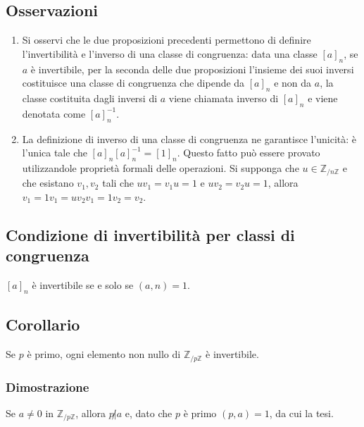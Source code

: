\subsection{Osservazioni}
\begin{enumerate}
\item Si osservi che le due proposizioni precedenti permettono di definire l'invertibilit\`a e l'inverso di una classe di congruenza: data una classe $[a]_n$, se $a$ \`e 
invertibile, per la seconda delle due proposizioni l'insieme dei suoi inversi costituisce una classe di congruenza che dipende da $[a]_n$ e non da $a$, la classe costituita 
dagli inversi di $a$ viene chiamata inverso di $[a]_n$ e viene denotata come $[a]_n^{-1}$. 
\item La definizione di inverso di una classe di congruenza ne garantisce l'unicit\`a: \`e l'unica tale che $[a]_n[a]_n^{-1}=[1]_n$. Questo fatto pu\`o essere provato 
utilizzandole propriet\`a formali delle operazioni. Si supponga che $u\in\mathbb{Z}_{/n\mathbb{Z}}$ e che esistano $v_1,v_2$ tali che $uv_1=v_1u=1$ e $uv_2=v_2u=1$, allora
$v_1=1v_1=uv_2v_1=1v_2=v_2$.
\end{enumerate}
\subsection{Condizione di invertibilit\`a per classi di congruenza}
$[a]_n$ \`e invertibile se e solo se $(a,n)=1$.
\subsection{Corollario}
Se $p$ \`e primo, ogni elemento non nullo di $\mathbb{Z}_{/p\mathbb{Z}}$ \`e invertibile.
\subsubsection{Dimostrazione}
Se $a\neq 0$ in $\mathbb{Z}_{/p\mathbb{Z}}$, allora $p\not|a$ e, dato che $p$ \`e primo $(p,a)=1$, da cui la tesi.
